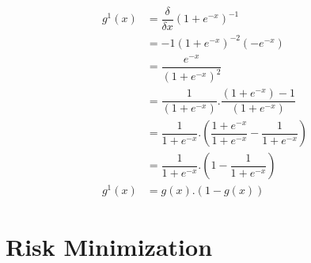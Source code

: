 \documentclass[12pt,a4paper,titlepage,landscape]{book}
\begin{document}
	\begin{equation}
	\begin{array}{cl}
		g^1(x) &= \dfrac{\delta}{\delta{x}} \left(1 + e^{-x}\right)^{-1} \\
		&= -1(1+e^{-x})^{-2}(-e^{-x}) \\
		&= \dfrac{e^{-x}}{\left(1+e^{-x}\right)^2} \\
		&= \dfrac{1}{\left(1+e^{-x}\right)}.\dfrac{(1+e^{-x})-1}{\left(1+e^{-x}\right)} \\
		&= \dfrac{1}{1+e^{-x}}.\left(\dfrac{1+e^{-x}}{1+e^{-x}} - \dfrac{1}{1+e^{-x}}\right) \\
		&= \dfrac{1}{1+e^{-x}}.\left(1 - \dfrac{1}{1+e^{-x}}\right) \\
		g^1(x) &= g(x).(1-g(x))
	\end{array}
	\end{equation}
	
	\section{Risk Minimization}
	
\end{document}
